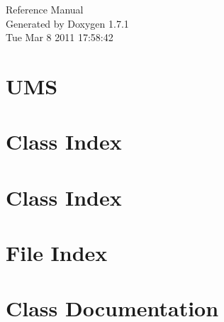 \documentclass[a4paper]{book}
\begin{document}
\hypersetup{pageanchor=false}
\begin{titlepage}
\vspace*{7cm}
\begin{center}
{\Large Reference Manual}\\
\vspace*{1cm}
{\large Generated by Doxygen 1.7.1}\\
\vspace*{0.5cm}
{\small Tue Mar 8 2011 17:58:42}\\
\end{center}
\end{titlepage}
\clearemptydoublepage
{}
\tableofcontents
\clearemptydoublepage
{}
\hypersetup{pageanchor=true}
\chapter{UMS}
\label{index}\hypertarget{index}{}
\chapter{Class Index}

\chapter{Class Index}

\chapter{File Index}

\chapter{Class Documentation}


























\end{document}
